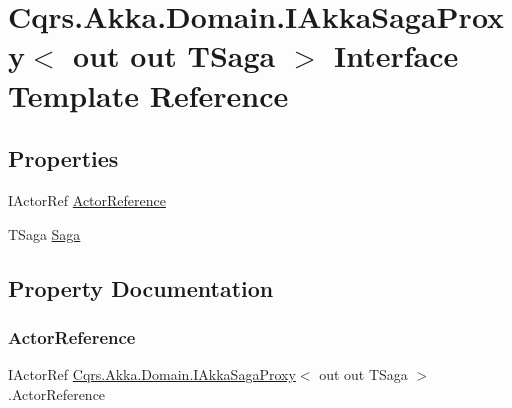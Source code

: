 \hypertarget{interfaceCqrs_1_1Akka_1_1Domain_1_1IAkkaSagaProxy}{}\section{Cqrs.\+Akka.\+Domain.\+I\+Akka\+Saga\+Proxy$<$ out out T\+Saga $>$ Interface Template Reference}
\label{interfaceCqrs_1_1Akka_1_1Domain_1_1IAkkaSagaProxy}
\subsection*{Properties}
\begin{DoxyCompactItemize}
\item 
I\+Actor\+Ref \hyperlink{interfaceCqrs_1_1Akka_1_1Domain_1_1IAkkaSagaProxy_a8edb3e9332787ee3a9059589c85ed9e5_a8edb3e9332787ee3a9059589c85ed9e5}{Actor\+Reference}
\item 
T\+Saga \hyperlink{interfaceCqrs_1_1Akka_1_1Domain_1_1IAkkaSagaProxy_adc230a1e98a8f4ed88a4230e0d0702e1_adc230a1e98a8f4ed88a4230e0d0702e1}{Saga}
\end{DoxyCompactItemize}


\subsection{Property Documentation}
\mbox{\label{interfaceCqrs_1_1Akka_1_1Domain_1_1IAkkaSagaProxy_a8edb3e9332787ee3a9059589c85ed9e5_a8edb3e9332787ee3a9059589c85ed9e5}} 
\subsubsection{\texorpdfstring{Actor\+Reference}{ActorReference}}
{\footnotesize\ttfamily I\+Actor\+Ref \hyperlink{interfaceCqrs_1_1Akka_1_1Domain_1_1IAkkaSagaProxy}{Cqrs.\+Akka.\+Domain.\+I\+Akka\+Saga\+Proxy}$<$ out out T\+Saga $>$.Actor\+Reference\hspace{0.3cm}{\ttfamily [get]}}

